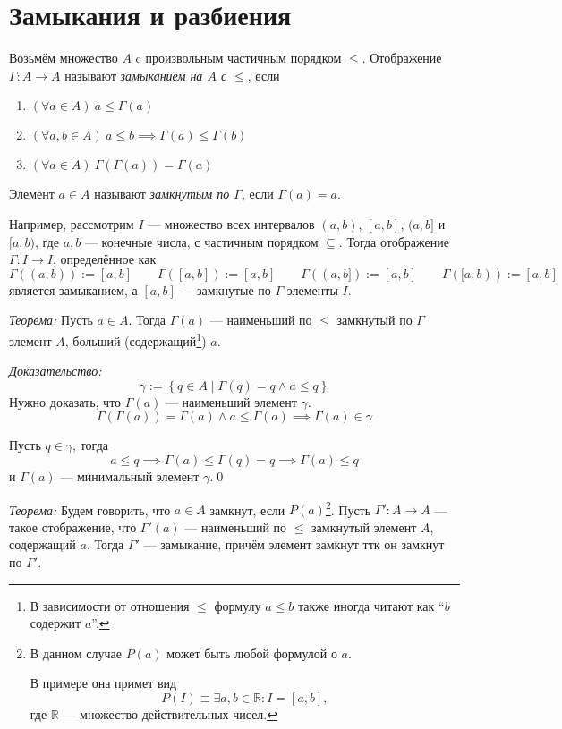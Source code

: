 \section{Замыкания и разбиения}

Возьмём множество $A$ c произвольным частичным порядком $\leq$. Отображение
$\Gamma:A\to A$ называют {\it замыканием на $A$ с $\leq$}, если
\begin{enumerate}
	\item{}$(\forall a\in A)~a\leq\Gamma(a)$
	\item{}$(\forall a,b\in A)~a\leq b\implies \Gamma(a)\leq \Gamma(b)$
	\item{}$(\forall a\in A)~\Gamma(\Gamma(a))=\Gamma(a)$
\end{enumerate}
Элемент ${a\in A}$ называют {\it замкнутым по $\Gamma$}, если ${\Gamma(a)=a}$.

Например, рассмотрим $I$ --- множество всех интервалов $(a,b)$, $[a,b]$, $(a,b]$
и $[a,b)$, где $a,b$ --- конечные числа, с частичным порядком $\subseteq$.
Тогда отображение $\Gamma:I\to I$, определённое как
\[
	\Gamma((a,b)):=[a,b]\qquad \Gamma([a,b]):=[a,b]\qquad
	\Gamma((a,b]):=[a,b]\qquad \Gamma([a,b)):=[a,b]
\]
является замыканием, а $[a,b]$ --- замкнутые по $\Gamma$ элементы $I$.

\vspace{1em}
{\it Теорема:} Пусть $a\in A$. Тогда $\Gamma(a)$ --- наименьший по $\leq$
замкнутый по $\Gamma$ элемент $A$,
больший (содержащий\footnote{В зависимости от отношения $\leq$ формулу
	$a\leq b$ также иногда читают как ``$b$ содержит $a$''.}) $a$.

	{\it Доказательство:}
\[
	\gamma:=\left\{q\in A\;\big|\; \Gamma(q)=q\land a\leq q\right\}
\]
Нужно доказать, что $\Gamma(a)$ --- наименьший элемент $\gamma$.
\[
	\Gamma(\Gamma(a))=\Gamma(a)\land a\leq\Gamma(a)\implies\Gamma(a)\in\gamma
\]

Пусть $q\in \gamma$, тогда
\[
	a\leq q\implies \Gamma(a)\leq\Gamma(q)=q\implies\Gamma(a)\leq q
\]
и $\Gamma(a)$ --- минимальный элемент $\gamma$.\qed

\newcommand\R{\mathbb R}
\vspace{1em}
{\it Теорема:}
Будем говорить, что ${a\in A}$ замкнут, если $P(a)$\footnote{В данном случае
$P(a)$ может быть любой формулой о $a$.

В примере она примет вид
\[
	P(I)\equiv \exists a,b\in\R:I=[a,b],
\]
где $\R$ --- множество действительных чисел.}.
Пусть ${\Gamma':A\to A}$ --- такое отображение, что $\Gamma'(a)$ --- наименьший по
$\leq$ замкнутый элемент $A$, содержащий $a$. Тогда $\Gamma'$ --- замыкание,
причём элемент замкнут ттк он замкнут по $\Gamma'$.

